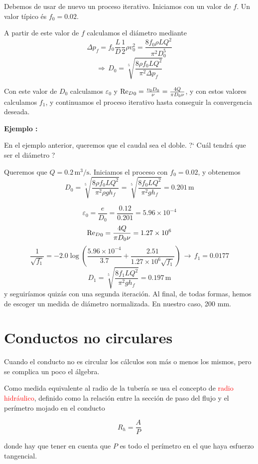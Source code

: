 Debemos de usar de nuevo un proceso iterativo. Iniciamos con un valor de $f$. Un valor típico és $f_0=0.02$.

A partir de este valor de $f$ calculamos el diámetro mediante
\[
\Delta p_f = f_0 \frac{L}{D}\frac{1}{2}\rho v_0^2 = \frac{8 f_0 \rho L Q^2}{\pi^2 D_0^5}
\]
\[
\Rightarrow  \, D_0 = \sqrt[5]{\frac{8 \rho f_0 L Q^2}{\pi^2 \Delta p_f}}
\]

Con este valor de $D_0$ calculamos $\varepsilon_0$ y ${\text{Re}_D}_0 = \frac{v_0 D_0}{\nu} = \frac{4 Q}{\pi D_0 \nu}$, y con estos valores  calculamos $f_1$, y continuamos el proceso iterativo hasta conseguir la convergencia deseada.

\textbf{Ejemplo : }

En el ejemplo anterior, queremos que el caudal sea el doble. ?` Cuál tendrá que ser el diámetro ?

Queremos que $Q=0.2\,\text{m}^3/\text{s}$. Iniciamos el proceso con $f_0=0.02$, y obtenemos
\[
D_0 = \sqrt[5]{\frac{8 \rho f_0 L Q^2}{\pi^2 \rho g h_f}} =
\sqrt[5]{\frac{8 f_0 L Q^2}{\pi^2 g h_f}} = 0.201\,\text{m}
\]

\[
\varepsilon_0 = \frac{e}{D_0} = \frac{0.12}{0.201} = 5.96\times10^{-4}
\]
\[
{\text{Re}_D}_0 = \frac{4 Q}{\pi D_0 \nu} = 1.27\times10^6
\]
\[
\frac{1}{\sqrt{f_1}} = -2.0 \log \left(\frac{5.96\times10^{-4}}{3.7}+\frac{2.51}{1.27\times 10^6\sqrt{f_1}}\right)
\, \rightarrow \, f_1 = 0.0177
\]
\[
D_1 = \sqrt[5]{\frac{8 f_1 L Q^2}{\pi^2 g h_f}} = 0.197\,\text{m}
\]
y seguiríamos quizás con una segunda iteración. Al final, de todas formas, hemos de escoger un medida de diámetro normalizada. En nuestro caso, 200 mm.

\section{Conductos no circulares}

Cuando el conducto no es circular los cálculos son más o menos los mismos, pero se complica un poco el álgebra.

Como medida equivalente al radio de la tubería se usa el concepto de \textcolor{red}{radio hidráulico}, definido como la relación entre la sección de paso del flujo y el perímetro mojado en el conducto

\begin{equation}
	R_h = \frac{A}{P}
\end{equation}


donde hay que tener en cuenta que $P$ es todo el perímetro en el que haya esfuerzo tangencial.

